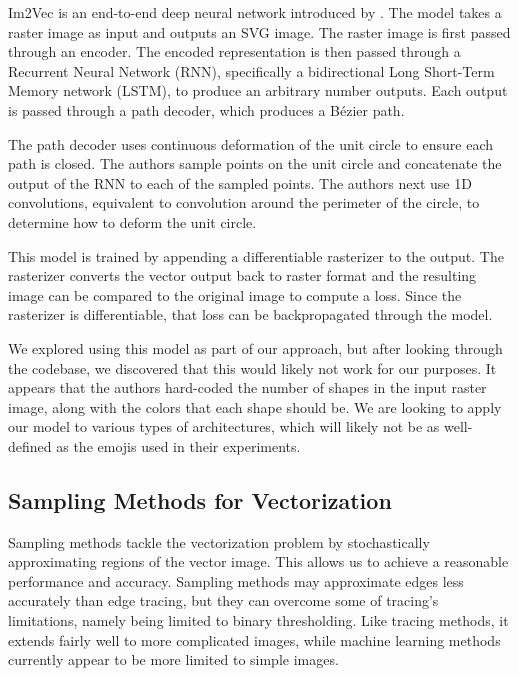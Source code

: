 Im2Vec is an end-to-end deep neural network introduced by . The model takes a raster image as input and outputs an SVG image. The raster image is first passed through an encoder. The encoded representation is then passed through a Recurrent Neural Network (RNN), specifically a bidirectional Long Short-Term Memory network (LSTM), to produce an arbitrary number outputs. Each output is passed through a path decoder, which produces a Bézier path. 

The path decoder uses continuous deformation of the unit circle to ensure each path is closed. The authors sample points on the unit circle and concatenate the output of the RNN to each of the sampled points. The authors next use 1D convolutions, equivalent to convolution around the perimeter of the circle, to determine how to deform the unit circle.

This model is trained by appending a differentiable rasterizer to the output. The rasterizer converts the vector output back to raster format and the resulting image can be compared to the original image to compute a loss. Since the rasterizer is differentiable, that loss can be backpropagated through the model. 

We explored using this model as part of our approach, but after looking through the codebase, we discovered that this would likely not work for our purposes. It appears that the authors hard-coded the number of shapes in the input raster image, along with the colors that each shape should be. We are looking to apply our model to various types of architectures, which will likely not be as well-defined as the emojis used in their experiments.

\subsection{Sampling Methods for Vectorization}

Sampling methods tackle the vectorization problem by stochastically approximating regions of the vector image. This allows us to achieve a reasonable performance and accuracy. Sampling methods may approximate edges less accurately than edge tracing, but they can overcome some of tracing's limitations, namely being limited to binary thresholding. Like tracing methods, it extends fairly well to more complicated images, while machine learning methods currently appear to be more limited to simple images.

